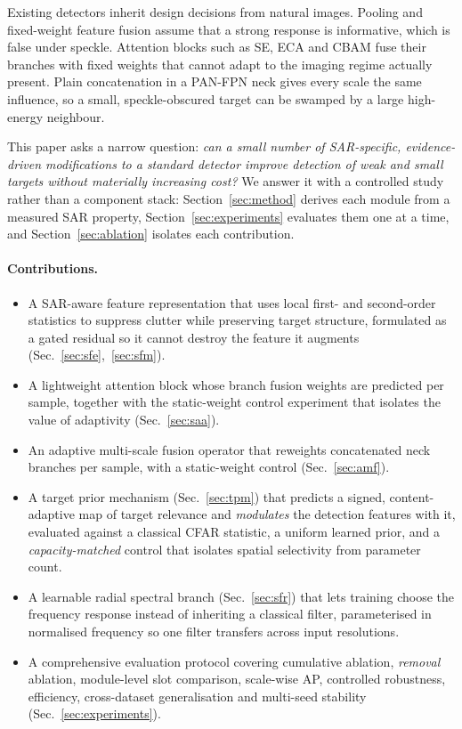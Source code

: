 \documentclass[10pt,twocolumn,letterpaper]{article}
\begin{document}
Existing detectors inherit design decisions from natural images. Pooling and
fixed-weight feature fusion assume that a strong response is informative, which
is false under speckle. Attention blocks such as SE, ECA and CBAM fuse their
branches with fixed weights that cannot adapt to the imaging regime actually
present. Plain concatenation in a PAN-FPN neck gives every scale the same
influence, so a small, speckle-obscured target can be swamped by a large
high-energy neighbour.

This paper asks a narrow question: \emph{can a small number of SAR-specific,
evidence-driven modifications to a standard detector improve detection of weak
and small targets without materially increasing cost?} We answer it with a
controlled study rather than a component stack:
Section~\ref{sec:method} derives each module from a measured SAR property,
Section~\ref{sec:experiments} evaluates them one at a time, and
Section~\ref{sec:ablation} isolates each contribution.

\paragraph{Contributions.}
\begin{itemize}
  \item A SAR-aware feature representation that uses local first- and
        second-order statistics to suppress clutter while preserving target
        structure, formulated as a gated residual so it cannot destroy the
        feature it augments (Sec.~\ref{sec:sfe},~\ref{sec:sfm}).
  \item A lightweight attention block whose branch fusion weights are predicted
        per sample, together with the static-weight control experiment that
        isolates the value of adaptivity (Sec.~\ref{sec:saa}).
  \item An adaptive multi-scale fusion operator that reweights concatenated neck
        branches per sample, with a static-weight control (Sec.~\ref{sec:amf}).
  \item A target prior mechanism (Sec.~\ref{sec:tpm}) that predicts a signed,
        content-adaptive map of target relevance and \emph{modulates} the
        detection features with it, evaluated against a classical CFAR statistic,
        a uniform learned prior, and a \emph{capacity-matched} control that
        isolates spatial selectivity from parameter count.
  \item A learnable radial spectral branch (Sec.~\ref{sec:sfr}) that lets
        training choose the frequency response instead of inheriting a classical
        filter, parameterised in normalised frequency so one filter transfers
        across input resolutions.
  \item A comprehensive evaluation protocol covering cumulative ablation,
        \emph{removal} ablation, module-level slot comparison, scale-wise AP,
        controlled robustness, efficiency, cross-dataset generalisation and
        multi-seed stability (Sec.~\ref{sec:experiments}).
\end{itemize}
\end{document}
